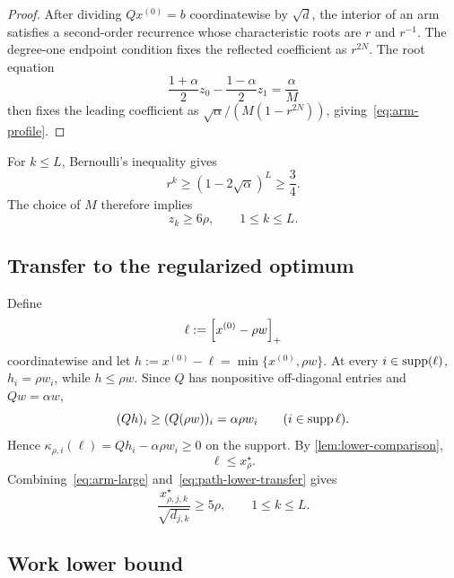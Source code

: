 \begin{proof}
After dividing $Qx^{(0)}=b$ coordinatewise by $\sqrt d$, the interior of an
arm satisfies a second-order recurrence whose characteristic roots are $r$
and $r^{-1}$.  The degree-one endpoint condition fixes the reflected
coefficient as $r^{2N}$.  The root equation
\[
 \frac{1+\alpha}{2}z_0-\frac{1-\alpha}{2}z_1=\frac\alpha M
\]
then fixes the leading coefficient as
$\sqrt\alpha/(M(1-r^{2N}))$, giving~\eqref{eq:arm-profile}.
\end{proof}

For $k\le L$, Bernoulli's inequality gives
\[
 r^k\ge(1-2\sqrt\alpha)^L\ge\frac34.
\]
The choice of $M$ therefore implies
\begin{equation}
  z_k\ge6\rho,
  \qquad 1\le k\le L.
  \label{eq:arm-large}
\end{equation}

\subsection{Transfer to the regularized optimum}

Define
\begin{equation}
 \ell:=\left[x^{(0)}-\rho w\right]_{+}
 \label{eq:path-lower-point}
\end{equation}
coordinatewise and let $h:=x^{(0)}-\ell=\min\{x^{(0)},\rho w\}$.
At every $i\in\operatorname{supp}(\ell)$, $h_i=\rho w_i$, while $h\le\rho w$.  Since $Q$
has nonpositive off-diagonal entries and $Qw=\alpha w$,
\begin{equation}
 (Qh)_i\ge(Q(\rho w))_i=\alpha\rho w_i
 \qquad (i\in\operatorname{supp}\ell).
\end{equation}
Hence $\kappa_{\rho,i}(\ell)=Qh_i-\alpha\rho w_i\ge0$ on the support.  By
\cref{lem:lower-comparison},
\begin{equation}
  \ell\le x_\rho^\star.
  \label{eq:path-lower-transfer}
\end{equation}
Combining~\eqref{eq:arm-large} and~\eqref{eq:path-lower-transfer} gives
\begin{equation}
 \frac{x_{\rho,j,k}^\star}{\sqrt{d_{j,k}}}
 \ge5\rho,
 \qquad 1\le k\le L.
 \label{eq:regularized-arm-large}
\end{equation}

\subsection{Work lower bound}

